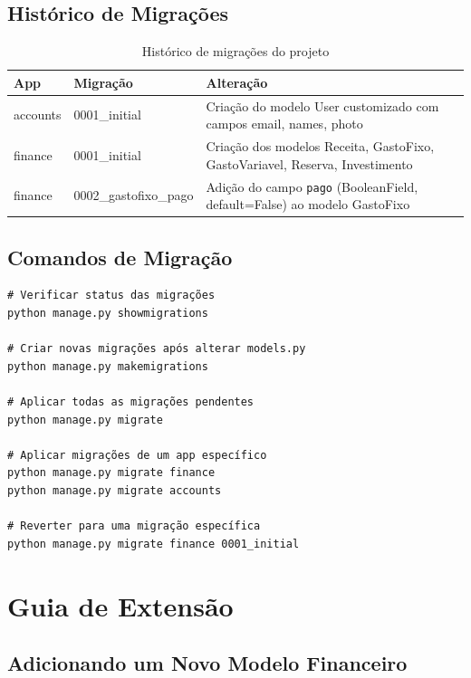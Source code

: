 \documentclass[12pt, a4paper, oneside]{report}
\begin{document}
\section{Histórico de Migrações}

\begin{table}[H]
\centering
\caption{Histórico de migrações do projeto}
\begin{tabularx}{\textwidth}{l l X}
\toprule
App & Migração & Alteração \\
\midrule
accounts & 0001\_initial & Criação do modelo User customizado com campos email, names, photo \\
finance & 0001\_initial & Criação dos modelos Receita, GastoFixo, GastoVariavel, Reserva, Investimento \\
finance & 0002\_gastofixo\_pago & Adição do campo \texttt{pago} (BooleanField, default=False) ao modelo GastoFixo \\
\bottomrule
\end{tabularx}
\end{table}

\section{Comandos de Migração}

\begin{lstlisting}[style=bash, caption={Comandos Django para gerenciamento de banco de dados}]
# Verificar status das migrações
python manage.py showmigrations

# Criar novas migrações após alterar models.py
python manage.py makemigrations

# Aplicar todas as migrações pendentes
python manage.py migrate

# Aplicar migrações de um app específico
python manage.py migrate finance
python manage.py migrate accounts

# Reverter para uma migração específica
python manage.py migrate finance 0001_initial
\end{lstlisting}

\chapter{Guia de Extensão}

\section{Adicionando um Novo Modelo Financeiro}
\end{document}
